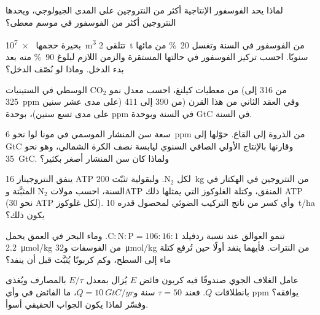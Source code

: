 \begin{exercise}[$\star$]\label{exo:b2:biogeochemical-cycles:4}
لماذا يحد الفوسفور الإنتاجية أكثر من النتروجين
على المدى الجيولوجي، ويحدها النتروجين أكثر من الفوسفور في
موسم معطى؟
\end{exercise}

\begin{exercise}[$\star\star$]\label{exo:b2:biogeochemical-cycles:5}
بحيرة حجمها \qty{e7}{m^3} تتلقى \qty{2}{t} من الفوسفور في السنة
وتغسل \qty{20}{\%} من مائها سنويًا. احسب تركيز الفوسفور
في حالتها المستقرة والزمن اللازم لبلوغ \qty{90}{\%}
منه بعد بدء الدخل. وماذا لو نُصّف الدخل؟
\end{exercise}

\begin{exercise}[$\star\star$]\label{exo:b2:biogeochemical-cycles:6}
من معطيات كيلنغ، احسب معدل نمو $\mathrm{CO_2}$ الوسطي في
الستينيات (من 316 إلى \qty{325}{ppm} على مدى عشر سنين) وفي العقد الثاني من هذا القرن
(من 390 إلى 411 على مدى تسع سنين)، بوحدة \unit{ppm} في السنة وبوحدة \unit{GtC} في السنة.
\end{exercise}

\begin{exercise}[$\star\star$]\label{exo:b2:biogeochemical-cycles:7}
سعة سن المنشار الموسمي في مونا لوا نحو
\qty{6}{ppm} من الذروة إلى القاع. حوّلها إلى GtC وقارنها
بالإنتاج الأولي الصافي السنوي ليابسة نصف الكرة الشمالي،
وهو نحو \qty{35}{GtC}. ولماذا كان سن المنشار أصغر بكثير؟
\end{exercise}

\begin{exercise}[$\star\star$]\label{exo:b2:biogeochemical-cycles:8}
ينفق النتروجيناز 16 ATP لكل $\mathrm{N_2}$. ولبقولية تثبّت
\qty{200}{kg} من النتروجين في الهكتار في السنة، احسب مولات
$\mathrm{N_2}$ المثبَّتة وATP المنفق، وكتلة الغلوكوز التي يمثلها ذلك
ATP (نحو 30 ATP لكل غلوكوز). وأي كسر من ناتج التركيب الضوئي
لمحصول قدره \qty{10}{t/ha} يكون ذلك؟
\end{exercise}

\begin{exercise}[$\star\star$]\label{exo:b2:biogeochemical-cycles:9}
تنمو العوالق عند نسبة ردفيلد $\mathrm{C:N:P} = 106:16:1$.
وماء البحر في العمق يحمل \qty{2.2}{\micro mol/kg} من الفوسفات
و\qty{32}{\micro mol/kg} من النترات. فأيهما ينفد أولًا حين تُرفع
كتلة ماء إلى السطح، وكم كربونًا يُثبَّت قبل أن
ينفد؟
\end{exercise}

\begin{exercise}[$\star\star\star$]\label{exo:b2:biogeochemical-cycles:10}
عامل الغلاف الجوي صندوقًا فيه كربون فائض $E$ يُزال بمعدل
$E/\tau$ بالمصارف ويُغذى بانطلاقات $Q$. فعند $\tau =
50$ سنة و$Q = \qty{10}{GtC/yr}$، ما الفائض في 
وأي \unit{ppm} يوافقه؟ وفسّر لماذا يكون الجواب الحقيقي أسوأ.
\end{exercise}

